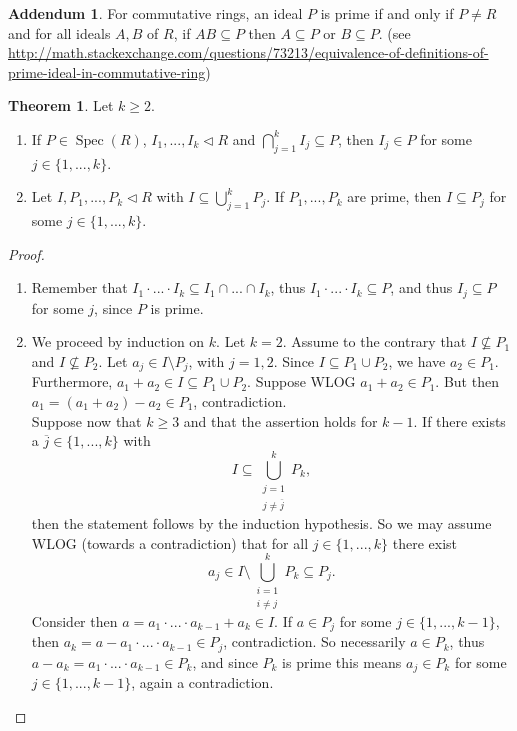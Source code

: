 \documentclass[12pt,a4paper]{report}
\theoremstyle{definition}
\newtheorem{theorem}{Theorem}[chapter] %
\newtheorem*{addendum}{Addendum}
\theoremstyle{num.custom-title}
\DeclareMathOperator{\sm}{\setminus}
\DeclareMathOperator{\sse}{\subseteq}
\DeclareMathOperator{\Spec}{Spec}
\newcommand{\ol}{\overline}
\begin{document}
\begin{addendum}
For commutative rings, an ideal $P$ is prime if and only if $P\neq R$ and for all ideals $A,B$ of $R$, if $AB\subseteq P$ then $A \sse P$ or $B \sse P$. (see \url{http://math.stackexchange.com/questions/73213/equivalence-of-definitions-of-prime-ideal-in-commutative-ring})
\end{addendum}

\begin{theorem}
Let $k \geq 2$.
\begin{enumerate}
\item If $P \in \Spec(R)$, $I_1,...,I_k \lhd R$ and $\bigcap_{j=1}^k I_j \sse P$, then $I_j \in P$ for some $j \in \{1,...,k\}$.
\item Let $I,P_1,...,P_k \lhd R$ with $I \sse \bigcup_{j=1}^k P_j$. If $P_1,...,P_k$ are prime, then $I \sse P_j$ for some $j \in \{1,...,k\}$.
\end{enumerate}
\begin{proof}\ 
\begin{enumerate}
\item Remember that $I_1 \cdot ... \cdot I_k \sse I_1 \cap ... \cap I_k$, thus $I_1 \cdot ... \cdot I_k \sse P$, and thus $I_j \sse P$ for some $j$, since $P$ is prime.
\item We proceed by induction on $k$. Let $k=2$. Assume to the contrary that $I \nsubseteq P_1$ and $I \nsubseteq P_2$. Let $a_j \in I \sm P_j$, with $j=1,2$. Since $I \sse P_1 \cup P_2$, we have $a_2 \in P_1$. Furthermore, $a_1+a_2 \in I \sse P_1 \cup P_2$. Suppose WLOG $a_1+a_2 \in P_1$. But then $a_1=(a_1+a_2)-a_2 \in P_1$, contradiction.\\
Suppose now that $k \geq 3$ and that the assertion holds for $k-1$. If there exists a $\ol{j} \in \{1,...,k\}$ with 
\[
I \sse \bigcup_{\substack{j=1\\ j \neq \ol{j}}}^k P_k,
\]
then the statement follows by the induction hypothesis. So we may assume WLOG (towards a contradiction) that for all $j \in \{1,...,k\}$ there exist 
\[
a_j \in I \sm \bigcup_{\substack{i=1\\ i \neq j}}^k P_k \sse P_j.
\]
Consider then $a=a_1 \cdot ... \cdot a_{k-1} + a_k \in I$. If $a \in P_j$ for some $j \in \{1,...,k-1\}$, then $a_k=a-a_1 \cdot ... \cdot a_{k-1} \in P_j$, contradiction. So necessarily $a \in P_k$, thus $a-a_k=a_1 \cdot ... \cdot a_{k-1} \in P_k$, and since $P_k$ is prime this means $a_j \in P_k$ for some $j \in \{1,...,k-1\}$, again a contradiction.
\end{enumerate}
\end{proof}
\end{theorem}
\end{document}

